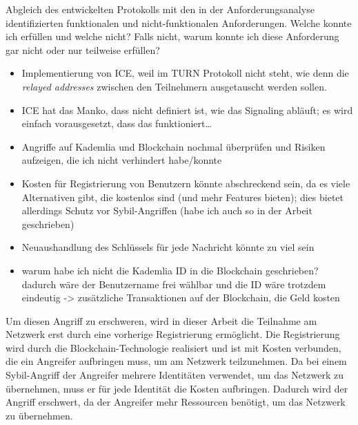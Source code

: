 
Abgleich des entwickelten Protokolls mit den in der Anforderungsanalyse identifizierten funktionalen und
nicht-funktionalen Anforderungen. Welche konnte ich erfüllen und welche nicht? Falls nicht, warum
konnte ich diese Anforderung gar nicht oder nur teilweise erfüllen?

\begin{itemize}
    \item Implementierung von ICE, weil im TURN Protokoll nicht steht, wie denn die \textit{relayed addresses} zwischen den Teilnehmern ausgetauscht werden sollen.
    \item ICE hat das Manko, dass nicht definiert ist, wie das Signaling abläuft; es wird einfach vorausgesetzt, dass das funktioniert\dots
    \item Angriffe auf Kademlia und Blockchain nochmal überprüfen und Risiken aufzeigen, die ich nicht verhindert habe/konnte
    \item Kosten für Registrierung von Benutzern könnte abschreckend sein, da es viele Alternativen gibt, die kostenlos sind (und mehr Features bieten); dies bietet allerdings Schutz vor Sybil-Angriffen (habe ich auch so in der Arbeit geschrieben)
    \item Neuaushandlung des Schlüssels für jede Nachricht könnte zu viel sein
    \item warum habe ich nicht die Kademlia ID in die Blockchain geschrieben? dadurch wäre der Benutzername frei wählbar und die ID wäre trotzdem eindeutig -> zusätzliche Transaktionen auf der Blockchain, die Geld kosten
\end{itemize}


Um diesen Angriff zu erschweren, wird in dieser Arbeit die Teilnahme am Netzwerk erst durch eine vorherige Registrierung ermöglicht. Die Registrierung wird durch die Blockchain-Technologie realisiert und ist mit Kosten verbunden, die ein Angreifer aufbringen muss, um am Netzwerk teilzunehmen. Da bei einem Sybil-Angriff der Angreifer mehrere Identitäten verwendet, um das Netzwerk zu übernehmen, muss er für jede Identität die Kosten aufbringen. Dadurch wird der Angriff erschwert, da der Angreifer mehr Ressourcen benötigt, um das Netzwerk zu übernehmen.

